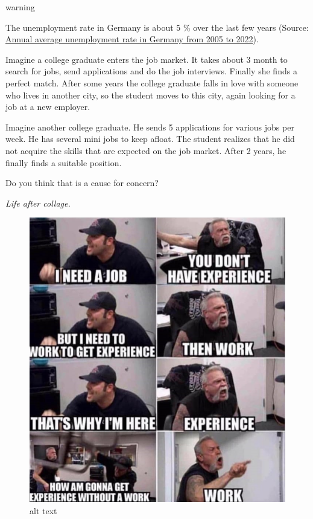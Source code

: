 \documentclass[
]{book}
\begin{document}
\begin{infobox2}warning

The unemployment rate in Germany is about 5 \% over the last few years (Source: \href{https://www.statista.com/statistics/227005/unemployment-rate-in-germany/}{Annual average unemployment rate in Germany from 2005 to 2022}).

Imagine a college graduate enters the job market. It takes about 3 month to search for jobs, send applications and do the job interviews. Finally she finds a perfect match. After some years the college graduate falls in love with someone who lives in another city, so the student moves to this city, again looking for a job at a new employer.

Imagine another college graduate. He sends 5 applications for various jobs per week. He has several mini jobs to keep afloat. The student realizes that he did not acquire the skills that are expected on the job market. After 2 years, he finally finds a suitable position.

Do you think that is a cause for concern?

\emph{Life after collage.}

\begin{figure}
\centering
\includegraphics{images/lifeaftercollege.png}
\caption{alt text}
\end{figure}

\end{infobox2}
\end{document}
